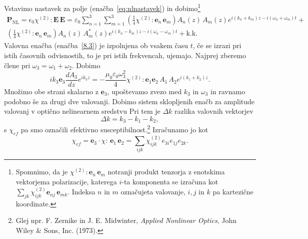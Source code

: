 Vstavimo nastavek za polje (enačba~\ref{eq:nlnastavek}) 
in dobimo\footnote{Spomnimo, da je $\chi^{(2)}:\mathbf{e}_{n}\,\mathbf{e}_{m}$ 
notranji produkt tenzorja z enotskima vektorjema polarizacije, 
katerega $i$-ta komponenta se izračuna kot $\sum_{jk}\chi^{(2)}_{ijk}\mathbf{e}_{nj}\,\mathbf{e}_{mk}$.
Indeksa $n$ in $m$ označujeta valovanje, $i, j$ in $k$ pa kartezične koordinate.}
\begin{multline}
\mathbf{P}_{\mathrm{NL}}= \epsilon_{0}\chi^{(2)}:\mathbf{E}\, \mathbf{E} =
\varepsilon_0 \sum_{n=1}^3 \sum_{m=1}^3 
 \left( \frac{1}{4} \chi^{(2)}:\mathbf{e}_{n}\,\mathbf{e}_{m}\right) 
 A_{n}(z)\,A_{m}(z) e^{i(k_{n}+k_{m})z-i(\omega_{n}+\omega_{m})t}+  \\
\left( \frac{1}{4} \chi^{(2)}:\mathbf{e}_{n}\,\mathbf{e}_{m}\right)
A_{n}(z)\,A_{m}^*(z) e^{i(k_{n}-k_{m})z-i(\omega_{n}-\omega_{m})t}+ \mathrm{k. k.}
\label{8.5b}
\end{multline}
Valovna enačba (enačba~\ref{8.3}) je izpolnjena ob vsakem času $t$, če se izrazi 
pri istih časovnih odvisnostih, to je pri istih frekvencah, ujemajo. Najprej 
zberemo člene pri $\omega_3 = \omega_1 + \omega_2$. Dobimo
\begin{equation}
ik_{3}\mathbf{e}_{3}\frac{dA_{3}}{dz}e^{ik_{3}z}=-\frac{\mu_{0} 
\varepsilon_0 \omega_{3}^{2}}{4}\chi^{(2)}:\mathbf{e}_{1}\mathbf{e}_{2}\,A_{1}\,A_{2}e^{i(k_{1}+k_{2})z}.
\label{8.7}
\end{equation}
Množimo obe strani skalarno z $\mathbf{e}_{3}$, upoštevamo zvezo med $k_{3}$ in $\omega_{3}$
in ravnamo podobno še za drugi dve valovanji. Dobimo sistem sklopljenih
enačb za amplitude valovanj v optično nelinearnem sredstvu
Pri tem je $\Delta k$ razlika valovnih vektorjev
\begin{equation}
\Delta k = k_{3}-k_{1}-k_{2},
\end{equation}
s $\chi_{ef}$ pa smo označili efektivno susceptibilnost.\footnote{Glej npr. F. Zernike in J. E. Midwinter, 
{\it Applied Nonlinear Optics}, John Wiley \& Sons, Inc. (1973).}
Izračunamo jo kot 
\begin{equation}
\chi_{ef}=\mathbf{e}_{3}\cdot\chi:\,\mathbf{e}_{1}\,\mathbf{e}_{2} = 
\sum_{ijk} \chi_{ijk}^{(2)} e_{3i} e_{1j} e_{2k}.
\label{eq:chicomp}
\end{equation}
